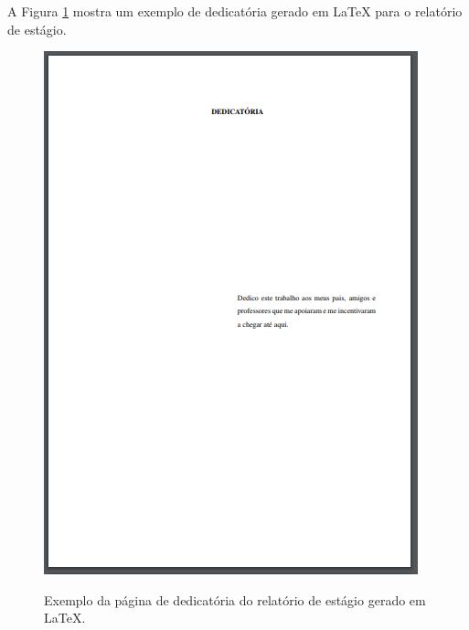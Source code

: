 \newpage
A Figura \ref{dedicest} mostra um exemplo de dedicatória gerado em LaTeX para o relatório de estágio.\\
\begin{figure}[h]
	\centering
	\includegraphics{imagens/relatorioEstagio/Dedicatoria.png}\\
	\caption{Exemplo da página de dedicatória do relatório de estágio gerado em LaTeX.}
	\label{dedicest}
\end{figure}


